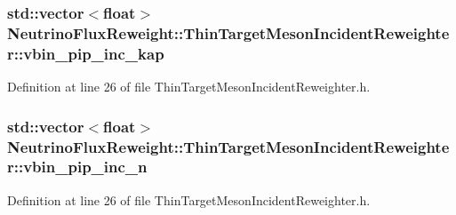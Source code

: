 \hypertarget{class_neutrino_flux_reweight_1_1_thin_target_meson_incident_reweighter_a313579b46a30eab2e8181bdbb616400b}{
\subsubsection[{vbin\-\_\-pip\-\_\-inc\-\_\-kap}]{\setlength{\rightskip}{0pt plus 5cm}std\-::vector$<$float$>$ Neutrino\-Flux\-Reweight\-::\-Thin\-Target\-Meson\-Incident\-Reweighter\-::vbin\-\_\-pip\-\_\-inc\-\_\-kap}}\label{class_neutrino_flux_reweight_1_1_thin_target_meson_incident_reweighter_a313579b46a30eab2e8181bdbb616400b}


Definition at line 26 of file Thin\-Target\-Meson\-Incident\-Reweighter.\-h.

\hypertarget{class_neutrino_flux_reweight_1_1_thin_target_meson_incident_reweighter_a709b2752b6bf405c479a985a136a8c5e}{
\subsubsection[{vbin\-\_\-pip\-\_\-inc\-\_\-n}]{\setlength{\rightskip}{0pt plus 5cm}std\-::vector$<$float$>$ Neutrino\-Flux\-Reweight\-::\-Thin\-Target\-Meson\-Incident\-Reweighter\-::vbin\-\_\-pip\-\_\-inc\-\_\-n}}\label{class_neutrino_flux_reweight_1_1_thin_target_meson_incident_reweighter_a709b2752b6bf405c479a985a136a8c5e}


Definition at line 26 of file Thin\-Target\-Meson\-Incident\-Reweighter.\-h.

